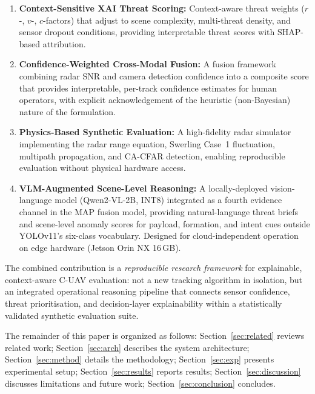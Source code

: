 \documentclass[drones,article,submit,pdftex]{Definitions/mdpi}
\begin{document}
\begin{enumerate}
  \item \textbf{Context-Sensitive XAI Threat Scoring:} Context-aware threat weights
        ($r$-, $v$-, $c$-factors) that adjust to scene complexity,
        multi-threat density, and sensor dropout conditions, providing
        interpretable threat scores with SHAP-based attribution.

  \item \textbf{Confidence-Weighted Cross-Modal Fusion:} A fusion framework
        combining radar SNR and camera detection confidence into a composite
        score that provides interpretable, per-track confidence estimates for
        human operators, with explicit acknowledgement of the heuristic
        (non-Bayesian) nature of the formulation.

  \item \textbf{Physics-Based Synthetic Evaluation:} A high-fidelity radar
        simulator implementing the radar range equation, Swerling Case~1
        fluctuation, multipath propagation, and CA-CFAR detection, enabling
        reproducible evaluation without physical hardware access.

  \item \textbf{VLM-Augmented Scene-Level Reasoning:} A locally-deployed
        vision-language model (Qwen2-VL-2B, INT8) integrated as a fourth
        evidence channel in the MAP fusion model, providing natural-language
        threat briefs and scene-level anomaly scores for payload, formation,
        and intent cues outside YOLOv11's six-class vocabulary.
        Designed for cloud-independent operation on edge hardware
        (Jetson Orin NX 16\,GB).
\end{enumerate}

The combined contribution is a \emph{reproducible research framework} for
explainable, context-aware C-UAV evaluation: not a new tracking algorithm in
isolation, but an integrated operational reasoning pipeline that connects
sensor confidence, threat prioritisation, and decision-layer explainability
within a statistically validated synthetic evaluation suite.

The remainder of this paper is organized as follows:
Section~\ref{sec:related} reviews related work;
Section~\ref{sec:arch} describes the system architecture;
Section~\ref{sec:method} details the methodology;
Section~\ref{sec:exp} presents experimental setup;
Section~\ref{sec:results} reports results;
Section~\ref{sec:discussion} discusses limitations and future work;
Section~\ref{sec:conclusion} concludes.
\end{document}
